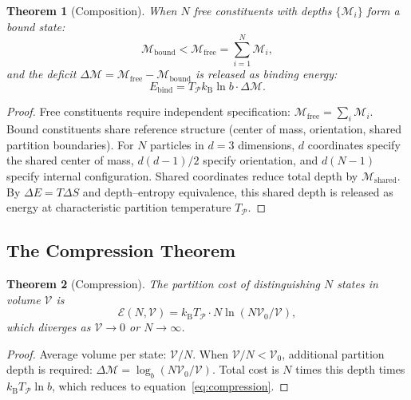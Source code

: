 \documentclass[twocolumn,10pt,a4paper]{article}
\newtheorem{theorem}{Theorem}[section]
\theoremstyle{definition}
\theoremstyle{remark}
\newcommand{\kB}{k_{\mathrm{B}}}
\newcommand{\Depth}{\mathcal{M}}
\newcommand{\Partition}{\mathcal{P}}
\begin{document}
\begin{theorem}[Composition]
\label{thm:composition}
When $N$ free constituents with depths $\{\Depth_i\}$ form a bound state:
\begin{equation}
    \Depth_{\mathrm{bound}} < \Depth_{\mathrm{free}} = \sum_{i=1}^{N}\Depth_i,
\end{equation}
and the deficit $\Delta\Depth = \Depth_{\mathrm{free}} - \Depth_{\mathrm{bound}}$ is released as binding energy:
\begin{equation}
    E_{\mathrm{bind}} = T_\Partition \kB \ln b \cdot \Delta\Depth.
    \label{eq:composition}
\end{equation}
\end{theorem}

\begin{proof}
Free constituents require independent specification: $\Depth_{\mathrm{free}} = \sum_i \Depth_i$. Bound constituents share reference structure (center of mass, orientation, shared partition boundaries). For $N$ particles in $d=3$ dimensions, $d$ coordinates specify the shared center of mass, $d(d-1)/2$ specify orientation, and $d(N-1)$ specify internal configuration. Shared coordinates reduce total depth by $\Depth_{\mathrm{shared}}$. By $\Delta E = T\Delta S$ and depth--entropy equivalence, this shared depth is released as energy at characteristic partition temperature $T_\Partition$.
\end{proof}

\subsection{The Compression Theorem}

\begin{theorem}[Compression]
\label{thm:compression}
The partition cost of distinguishing $N$ states in volume $\mathcal{V}$ is
\begin{equation}
    \mathcal{E}(N,\mathcal{V}) = \kB T_\Partition \cdot N\ln(N\mathcal{V}_0/\mathcal{V}),
    \label{eq:compression}
\end{equation}
which diverges as $\mathcal{V} \to 0$ or $N\to\infty$.
\end{theorem}

\begin{proof}
Average volume per state: $\mathcal{V}/N$. When $\mathcal{V}/N < \mathcal{V}_0$, additional partition depth is required: $\Delta\Depth = \log_b(N\mathcal{V}_0/\mathcal{V})$. Total cost is $N$ times this depth times $\kB T_\Partition\ln b$, which reduces to equation~\eqref{eq:compression}.
\end{proof}
\end{document}
